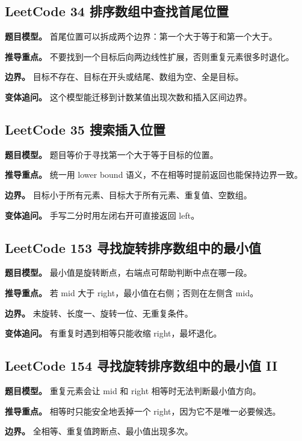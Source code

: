 \subsection{LeetCode 34 排序数组中查找首尾位置}

\textbf{题目模型。} 首尾位置可以拆成两个边界：第一个大于等于和第一个大于。

\textbf{推导重点。} 不要找到一个目标后向两边线性扩展，否则重复元素很多时退化。

\textbf{边界。} 目标不存在、目标在开头或结尾、数组为空、全是目标。

\textbf{变体追问。} 这个模型能迁移到计数某值出现次数和插入区间边界。

\subsection{LeetCode 35 搜索插入位置}

\textbf{题目模型。} 题目等价于寻找第一个大于等于目标的位置。

\textbf{推导重点。} 统一用 lower bound 语义，不在相等时提前返回也能保持边界一致。

\textbf{边界。} 目标小于所有元素、目标大于所有元素、重复值、空数组。

\textbf{变体追问。} 手写二分时用左闭右开可直接返回 left。

\subsection{LeetCode 153 寻找旋转排序数组中的最小值}

\textbf{题目模型。} 最小值是旋转断点，右端点可帮助判断中点在哪一段。

\textbf{推导重点。} 若 mid 大于 right，最小值在右侧；否则在左侧含 mid。

\textbf{边界。} 未旋转、长度一、旋转一位、无重复条件。

\textbf{变体追问。} 有重复时遇到相等只能收缩 right，最坏退化。

\subsection{LeetCode 154 寻找旋转排序数组中的最小值 II}

\textbf{题目模型。} 重复元素会让 mid 和 right 相等时无法判断最小值方向。

\textbf{推导重点。} 相等时只能安全地丢掉一个 right，因为它不是唯一必要候选。

\textbf{边界。} 全相等、重复值跨断点、最小值出现多次。

